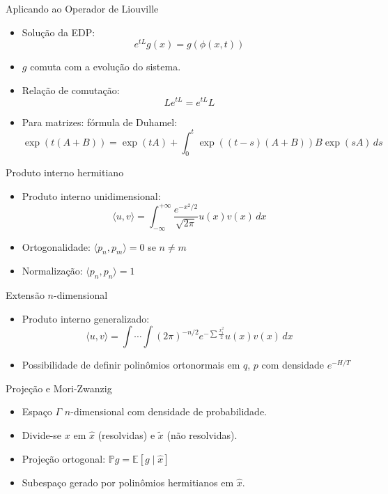 \begin{frame}{Aplicando ao Operador de Liouville}
\begin{itemize}
    \item Solução da EDP:
    \begin{equation*}
        e^{tL}g(x) = g(\phi(x,t))
    \end{equation*}
    \item $g$ comuta com a evolução do sistema.
    \item Relação de comutação:
    \begin{equation*}
        Le^{tL} = e^{tL}L
    \end{equation*}
    \item Para matrizes: fórmula de Duhamel:
    \begin{equation*}
        \exp(t(A+B)) = \exp(tA) + \int_0^t \exp((t-s)(A+B)) B \exp(sA)\, ds
    \end{equation*}
\end{itemize}
\end{frame}

\begin{frame}{Produto interno hermitiano}
\begin{itemize}
    \item Produto interno unidimensional:
    \begin{equation*}
        \langle u, v \rangle = \int_{-\infty}^{+\infty} \frac{e^{-x^2/2}}{\sqrt{2\pi}} u(x)v(x)\, dx
    \end{equation*}
    \item Ortogonalidade: $\langle p_n, p_m \rangle = 0$ se $n \neq m$
    \item Normalização: $\langle p_n, p_n \rangle = 1$
\end{itemize}
\end{frame}

\begin{frame}{Extensão $n$-dimensional}
\begin{itemize}
    \item Produto interno generalizado:
    \begin{equation*}
        \langle u, v \rangle = \int \cdots \int (2\pi)^{-n/2} e^{-\sum \frac{x_i^2}{2}} u(x)v(x)\, dx
    \end{equation*}
    \item Possibilidade de definir polinômios ortonormais em $q$, $p$ com densidade $e^{-H/T}$
\end{itemize}
\end{frame}

\begin{frame}{Projeção e Mori-Zwanzig}
\begin{itemize}
    \item Espaço $\Gamma$ $n$-dimensional com densidade de probabilidade.
    \item Divide-se $x$ em $\hat{x}$ (resolvidas) e $\tilde{x}$ (não resolvidas).
    \item Projeção ortogonal: $\mathbb{P}g = \mathbb{E}[g \mid \hat{x}]$
    \item Subespaço gerado por polinômios hermitianos em $\hat{x}$.
\end{itemize}
\end{frame}